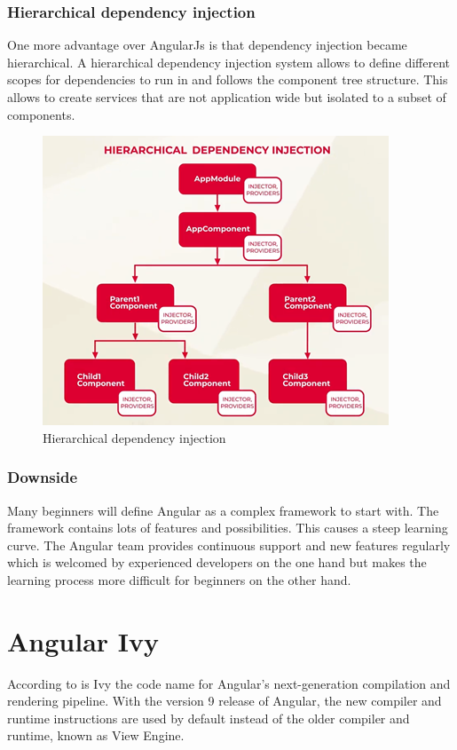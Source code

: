 \subsubsection{Hierarchical dependency injection}
One more advantage over AngularJs is that dependency injection became hierarchical. A hierarchical dependency injection system allows to define different scopes for dependencies to run in and follows the component tree structure. This allows to create services that are not application wide but isolated to a subset of components.
\autocite{Rylan}
\begin{figure}[h!]
    \caption{Hierarchical dependency injection}
    \centering
    \includegraphics[width=\textwidth]{img/hieradi.png} 
\end{figure}

\subsubsection{Downside}
Many beginners will define Angular as a complex framework to start with. The framework contains lots of features and possibilities. This causes a steep learning curve. The Angular team provides continuous support and new features regularly which is welcomed by experienced developers on the one hand but makes the learning process more difficult for beginners on the other hand.
\autocite{AltexSoft}

\section{Angular Ivy}
According to \textcite{Angular.io-ivy} is Ivy the code name for Angular's next-generation compilation and rendering pipeline. With the version 9 release of Angular, the new compiler and runtime instructions are used by default instead of the older compiler and runtime, known as View Engine.

